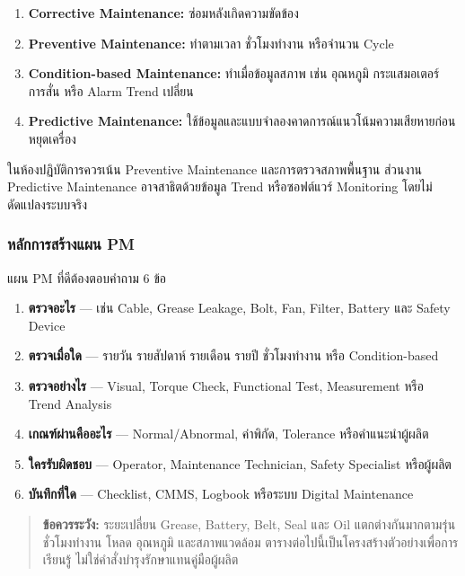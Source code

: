 \begin{enumerate}
    \item \textbf{Corrective Maintenance:} ซ่อมหลังเกิดความขัดข้อง
    \item \textbf{Preventive Maintenance:} ทำตามเวลา ชั่วโมงทำงาน หรือจำนวน Cycle
    \item \textbf{Condition-based Maintenance:} ทำเมื่อข้อมูลสภาพ เช่น อุณหภูมิ กระแสมอเตอร์ การสั่น หรือ Alarm Trend เปลี่ยน
    \item \textbf{Predictive Maintenance:} ใช้ข้อมูลและแบบจำลองคาดการณ์แนวโน้มความเสียหายก่อนหยุดเครื่อง
\end{enumerate}

ในห้องปฏิบัติการควรเน้น Preventive Maintenance และการตรวจสภาพพื้นฐาน ส่วนงาน Predictive Maintenance อาจสาธิตด้วยข้อมูล Trend หรือซอฟต์แวร์ Monitoring โดยไม่ดัดแปลงระบบจริง

\subsubsection{หลักการสร้างแผน PM}

แผน PM ที่ดีต้องตอบคำถาม 6 ข้อ

\begin{enumerate}
    \item \textbf{ตรวจอะไร} — เช่น Cable, Grease Leakage, Bolt, Fan, Filter, Battery และ Safety Device
    \item \textbf{ตรวจเมื่อใด} — รายวัน รายสัปดาห์ รายเดือน รายปี ชั่วโมงทำงาน หรือ Condition-based
    \item \textbf{ตรวจอย่างไร} — Visual, Torque Check, Functional Test, Measurement หรือ Trend Analysis
    \item \textbf{เกณฑ์ผ่านคืออะไร} — Normal/Abnormal, ค่าพิกัด, Tolerance หรือคำแนะนำผู้ผลิต
    \item \textbf{ใครรับผิดชอบ} — Operator, Maintenance Technician, Safety Specialist หรือผู้ผลิต
    \item \textbf{บันทึกที่ใด} — Checklist, CMMS, Logbook หรือระบบ Digital Maintenance
\end{enumerate}

\begin{quote}
\textbf{ข้อควรระวัง:} ระยะเปลี่ยน Grease, Battery, Belt, Seal และ Oil แตกต่างกันมากตามรุ่น ชั่วโมงทำงาน โหลด อุณหภูมิ และสภาพแวดล้อม ตารางต่อไปนี้เป็นโครงสร้างตัวอย่างเพื่อการเรียนรู้ ไม่ใช่คำสั่งบำรุงรักษาแทนคู่มือผู้ผลิต
\end{quote}

\newpage

